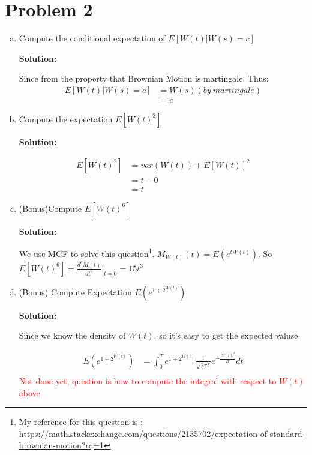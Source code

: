 \documentclass[11pt]{article} %
\begin{document}
\section*{Problem 2}
\begin{enumerate}[(a)]
    \item Compute the conditional expectation of $E[W(t)|W(s)=c]$
    
    \textbf{Solution:}

    Since from the property that Brownian Motion is martingale.
    Thus:
    \begin{align*}
        E[W(t)|W(s)=c] &= W(s) (by\ martingale)\\
                        &= c
    \end{align*}

    \item Compute the expectation $E[W(t)^2]$
    
    \textbf{Solution:}

    \begin{align*}
        E[W(t)^2] &= var(W(t))+E[W(t)]^2\\
                &= t-0\\
                &= t
    \end{align*}


    \item (Bonus)Compute $E[W(t)^6]$
    
    \textbf{Solution:}

    We use MGF to solve this question\footnote{My reference for this question is : \url{https://math.stackexchange.com/questions/2135702/expectation-of-standard-brownian-motion?rq=1}}. $M_{W(t)}(t)= E(e^{tW(t)})$. So $E[W(t)^6]=\frac{d^6M(t)}{dt^6}|_{t=0}=15t^3$







    \item (Bonus) Compute Expectation $E(e^{1+2^{W(t)}})$
    
    \textbf{Solution:}

    Since we know the density of $W(t)$, so it's easy to get the expected valuse.

    \begin{align*}
        E(e^{1+2^{W(t)}}) &= \int_0^T e^{1+2^{W(t)}} \frac{1}{\sqrt{2\pi t}} e^{-\frac{W(t)^2}{2t}}dt\\             
    \end{align*}
    \textcolor{red}{Not done yet, question is how to compute the integral with respect to $W(t)$ above}

\end{enumerate}
\end{document}
